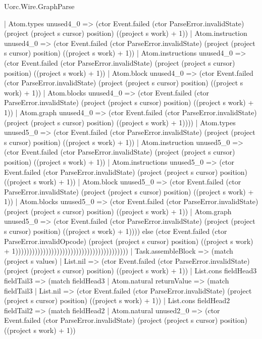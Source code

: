 \begin{lexlean}{Uorc.Wire.GraphParse}
\begin{semanticmodule}
{              | Atom.types unused4_0 => (ctor Event.failed (ctor ParseError.invalidState) (project (project s cursor) position) ((project s work) + 1))
              | Atom.instruction unused4_0 => (ctor Event.failed (ctor ParseError.invalidState) (project (project s cursor) position) ((project s work) + 1))
              | Atom.instructions unused4_0 => (ctor Event.failed (ctor ParseError.invalidState) (project (project s cursor) position) ((project s work) + 1))
              | Atom.block unused4_0 => (ctor Event.failed (ctor ParseError.invalidState) (project (project s cursor) position) ((project s work) + 1))
              | Atom.blocks unused4_0 => (ctor Event.failed (ctor ParseError.invalidState) (project (project s cursor) position) ((project s work) + 1))
              | Atom.graph unused4_0 => (ctor Event.failed (ctor ParseError.invalidState) (project (project s cursor) position) ((project s work) + 1))))
          | Atom.types unused5_0 => (ctor Event.failed (ctor ParseError.invalidState) (project (project s cursor) position) ((project s work) + 1))
          | Atom.instruction unused5_0 => (ctor Event.failed (ctor ParseError.invalidState) (project (project s cursor) position) ((project s work) + 1))
          | Atom.instructions unused5_0 => (ctor Event.failed (ctor ParseError.invalidState) (project (project s cursor) position) ((project s work) + 1))
          | Atom.block unused5_0 => (ctor Event.failed (ctor ParseError.invalidState) (project (project s cursor) position) ((project s work) + 1))
          | Atom.blocks unused5_0 => (ctor Event.failed (ctor ParseError.invalidState) (project (project s cursor) position) ((project s work) + 1))
          | Atom.graph unused5_0 => (ctor Event.failed (ctor ParseError.invalidState) (project (project s cursor) position) ((project s work) + 1)))) else (ctor Event.failed (ctor ParseError.invalidOpcode) (project (project s cursor) position) ((project s work) + 1)))))))))))))))))))))))))))))))))))))))))
      | Task.assembleBlock => (match (project s values)
        | List.nil => (ctor Event.failed (ctor ParseError.invalidState) (project (project s cursor) position) ((project s work) + 1))
        | List.cons fieldHead3 fieldTail3 => (match fieldHead3
          | Atom.natural returnValue => (match fieldTail3
            | List.nil => (ctor Event.failed (ctor ParseError.invalidState) (project (project s cursor) position) ((project s work) + 1))
            | List.cons fieldHead2 fieldTail2 => (match fieldHead2
              | Atom.natural unused2_0 => (ctor Event.failed (ctor ParseError.invalidState) (project (project s cursor) position) ((project s work) + 1))
}
\end{semanticmodule}
\end{lexlean}
